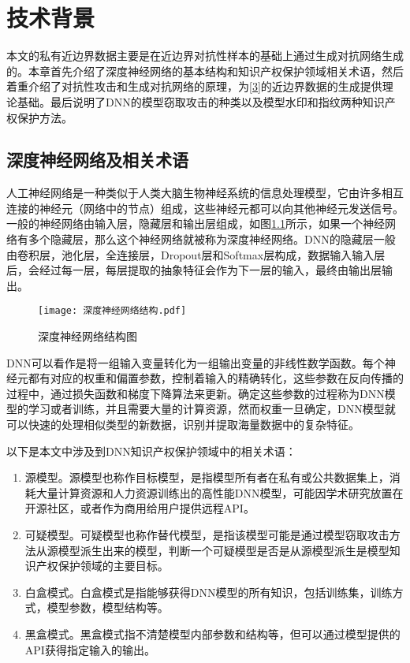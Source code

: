 

\chapter{技术背景} 
\label{2}

本文的私有近边界数据主要是在近边界对抗性样本的基础上通过生成对抗网络生成的。本章首先介绍了深度神经网络的基本结构和知识产权保护领域相关术语，然后着重介绍了对抗性攻击和生成对抗网络的原理，为\ref{3}的近边界数据的生成提供理论基础。最后说明了DNN的模型窃取攻击的种类以及模型水印和指纹两种知识产权保护方法。

\section{深度神经网络及相关术语}

人工神经网络是一种类似于人类大脑生物神经系统的信息处理模型，它由许多相互连接的神经元（网络中的节点）组成，这些神经元都可以向其他神经元发送信号。一般的神经网络由输入层，隐藏层和输出层组成，如图\ref{深度神经网络结构图}所示，如果一个神经网络有多个隐藏层，那么这个神经网络就被称为深度神经网络。DNN的隐藏层一般由卷积层，池化层，全连接层，Dropout层和Softmax层构成，数据输入输入层后，会经过每一层，每层提取的抽象特征会作为下一层的输入，最终由输出层输出。

\begin{figure}[htbp]%
	\centering
	\texttt{[image: 深度神经网络结构.pdf]}
	\setlength{\abovecaptionskip}{5mm} %
	\caption{深度神经网络结构图}
	\label{深度神经网络结构图}
\end {figure}

DNN可以看作是将一组输入变量转化为一组输出变量的非线性数学函数。每个神经元都有对应的权重和偏置参数，控制着输入的精确转化，这些参数在反向传播的过程中，通过损失函数和梯度下降算法来更新。确定这些参数的过程称为DNN模型的学习或者训练，并且需要大量的计算资源，然而权重一旦确定，DNN模型就可以快速的处理相似类型的新数据，识别并提取海量数据中的复杂特征。

以下是本文中涉及到DNN知识产权保护领域中的相关术语：

\begin{enumerate}
	\renewcommand{\labelenumi}{\theenumi)}
	\item 源模型。源模型也称作目标模型，是指模型所有者在私有或公共数据集上，消耗大量计算资源和人力资源训练出的高性能DNN模型，可能因学术研究放置在开源社区，或者作为商用给用户提供远程API。
	\item 可疑模型。可疑模型也称作替代模型，是指该模型可能是通过模型窃取攻击方法从源模型派生出来的模型，判断一个可疑模型是否是从源模型派生是模型知识产权保护领域的主要目标。
	\item 白盒模式。白盒模式是指能够获得DNN模型的所有知识，包括训练集，训练方式，模型参数，模型结构等。
	\item 黑盒模式。黑盒模式指不清楚模型内部参数和结构等，但可以通过模型提供的API获得指定输入的输出。
\end{enumerate}



